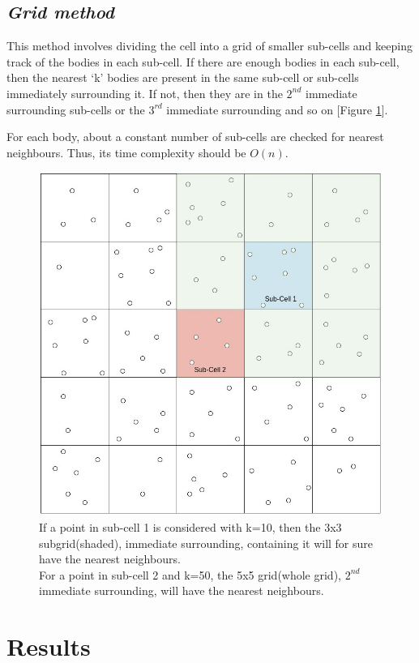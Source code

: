 \documentclass[twocolumn,11pt]{article}
\begin{document}
\subsection{\textit{Grid method}}
This method involves dividing the cell into a grid of smaller sub-cells and keeping track of the bodies in each sub-cell. If there are enough bodies in each sub-cell, then the nearest `k' bodies are present in the same sub-cell or sub-cells immediately surrounding it. If not, then they are in the $2^{nd}$ immediate surrounding sub-cells or the $3^{rd}$ immediate surrounding and so on [Figure \ref{fig4}].

For each body, about a constant number of sub-cells are checked for nearest neighbours. Thus, its time complexity should be $O(n)$.
\begin{figure}[h]
\centering
	\includegraphics[width=0.9\linewidth]{grideg}
	\caption{\small{If a point in sub-cell 1 is considered with k=10, then the 3x3 subgrid(shaded), immediate surrounding, containing it will for sure have the nearest neighbours.\\ 
	For a point in sub-cell 2 and k=50, the 5x5 grid(whole grid), $2^{nd}$ immediate surrounding, will have the nearest neighbours.}}
	\label{fig4}
\end{figure}

\section{Results}
\end{document}
